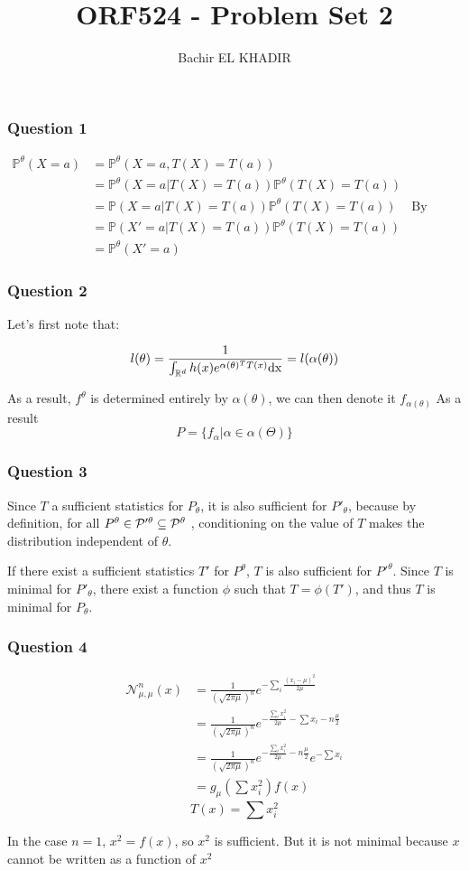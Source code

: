 \documentclass[12pt]{article}
\title{ORF524 - Problem Set 2}
\author{Bachir EL KHADIR }
\newcommand{\Q}[1]{\subsubsection*{Question #1}}
\begin{document}
\maketitle

\Q{1}
\begin{align}
\mathbb{P}^{\theta}(X = a) 
&= \mathbb{P}^{\theta}(X = a , T(X) = T(a)) \\
&= \mathbb{P}^{\theta}(X = a | T(X) = T(a))\mathbb{P}^{\theta}(T(X) = T(a)) \\
&= \mathbb{P}(X = a | T(X) = T(a))\mathbb{P}^{\theta}(T(X) = T(a)) & \text{By definition of sufficiency}\\
&= \mathbb{P}(X' = a | T(X) = T(a))\mathbb{P}^{\theta}(T(X) = T(a)) \\
&= \mathbb{P}^{\theta}(X' = a)
\end{align}


\Q{2}
Let's first note that:

$$l(\theta) = \frac{1}{\int_{\mathbb{R}^d} h(x) e^{\alpha(\theta)^T T(x)} \rm{d}x} = l(\alpha(\theta))$$

As a result, $f^{\theta}$ is determined entirely by $\alpha(\theta)$, we can then denote it $f_{\alpha(\theta)}$
As a result 
$$P = \{ f_{\alpha} | \alpha \in \alpha(\Theta) \}$$

\Q{3}
Since $T$ a sufficient statistics for $P_{\theta}$, it is also sufficient for $P'_{\theta}$, because by definition, for all $P^{\theta} \in \cal P'^{\theta} \subseteq \cal P^{\theta}$ , conditioning on the value of $T$ makes the distribution independent of $\theta$.

If there exist a sufficient statistics $T'$ for $P^{\theta}$, $T$ is also sufficient for $P'^{\theta}$. Since $T$ is minimal for $P'_{\theta}$, there exist a function $\phi$ such that $T = \phi(T')$, and thus $T$ is minimal for $P_{\theta}$.

\Q{4}
\begin{align}
\mathcal{N}^n_{\mu, \mu}(x) 
&= \frac{1}{(\sqrt{2\pi\mu})^n} e^{-\sum_i \frac{(x_i-\mu)^2}{2\mu}} \\
&= \frac{1}{(\sqrt{2\pi\mu})^n} e^{ - \frac{\sum_i x_i^2}{2\mu} - \sum x_i - n\frac{\mu}{2}} \\
&= \frac{1}{(\sqrt{2\pi\mu})^n} e^{ - \frac{\sum_i x_i^2}{2\mu} - n\frac{\mu}{2}} e^{-\sum x_i} \\
&= g_{\mu}(\sum x_i^2) f(x)
\end{align}
$$T(x) = \sum x_i^2$$

In the case $n=1$, $x^2 = f(x) $, so $x^2$ is sufficient. But it is not minimal because $x$ cannot be written as a function of $x^2$
\end{document}
